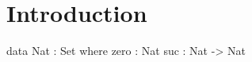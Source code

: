 \chapter{Introduction}
\label{chapter:introduction}

\begin{code}
data Nat : Set where
  zero  :  Nat
  suc   :  Nat -> Nat
\end{code}
